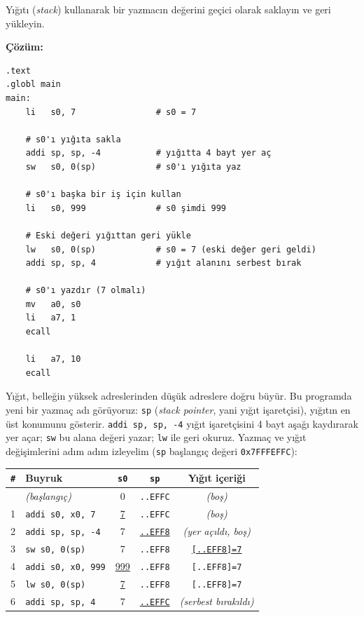 \begin{ornek}[4.3]
\label{orn:yigit-temel}
Yığıtı (\emph{stack}) kullanarak bir yazmacın değerini geçici olarak saklayın ve geri yükleyin.

\textbf{Çözüm:}

\begin{lstlisting}[style=riscv]
.text
.globl main
main:
    li   s0, 7                # s0 = 7

    # s0'ı yığıta sakla
    addi sp, sp, -4           # yığıtta 4 bayt yer aç
    sw   s0, 0(sp)            # s0'ı yığıta yaz

    # s0'ı başka bir iş için kullan
    li   s0, 999              # s0 şimdi 999

    # Eski değeri yığıttan geri yükle
    lw   s0, 0(sp)            # s0 = 7 (eski değer geri geldi)
    addi sp, sp, 4            # yığıt alanını serbest bırak

    # s0'ı yazdır (7 olmalı)
    mv   a0, s0
    li   a7, 1
    ecall

    li   a7, 10
    ecall
\end{lstlisting}

Yığıt, belleğin yüksek adreslerinden düşük adreslere doğru büyür. Bu programda yeni bir yazmaç adı görüyoruz: \texttt{sp} (\emph{stack pointer}, yani yığıt işaretçisi), yığıtın en üst konumunu gösterir. \texttt{addi sp, sp, -4} yığıt işaretçisini 4 bayt aşağı kaydırarak yer açar; \texttt{sw} bu alana değeri yazar; \texttt{lw} ile geri okuruz. Yazmaç ve yığıt değişimlerini adım adım izleyelim (\texttt{sp} başlangıç değeri \texttt{0x7FFFEFFC}):

\begin{center}
\small
\begin{tabular}{clccc}
\toprule
\texttt{\#} & Buyruk & \texttt{s0} & \texttt{sp} & Yığıt içeriği \\
\midrule
   & \emph{(başlangıç)} & 0 & \texttt{..EFFC} & \emph{(boş)} \\
1 & \texttt{addi s0, x0, 7} & \underline{7} & \texttt{..EFFC} & \emph{(boş)} \\
2 & \texttt{addi sp, sp, -4} & 7 & \underline{\texttt{..EFF8}} & \emph{(yer açıldı, boş)} \\
3 & \texttt{sw s0, 0(sp)} & 7 & \texttt{..EFF8} & \underline{\texttt{[..EFF8]=7}} \\
4 & \texttt{addi s0, x0, 999} & \underline{999} & \texttt{..EFF8} & \texttt{[..EFF8]=7} \\
5 & \texttt{lw s0, 0(sp)} & \underline{7} & \texttt{..EFF8} & \texttt{[..EFF8]=7} \\
6 & \texttt{addi sp, sp, 4} & 7 & \underline{\texttt{..EFFC}} & \emph{(serbest bırakıldı)} \\
\bottomrule
\end{tabular}
\end{center}


\end{ornek}
